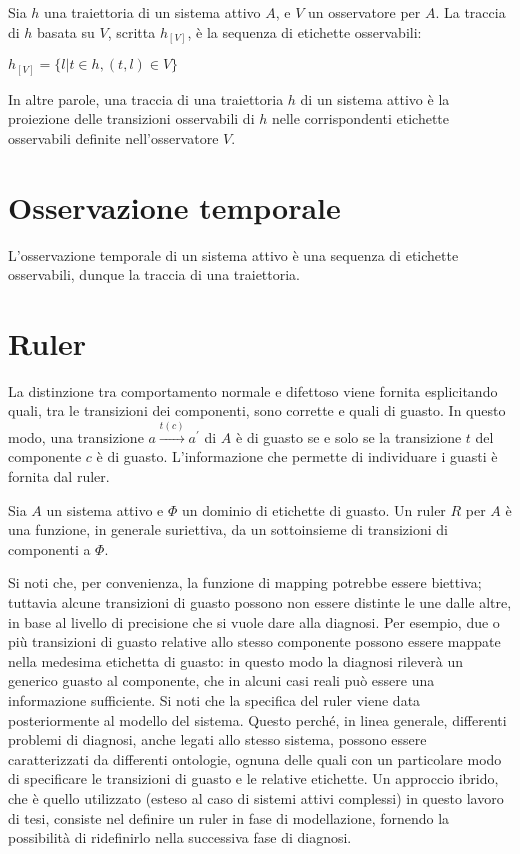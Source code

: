 \begin{defn}
Sia $h$ una traiettoria di un sistema attivo $A$, e $V$ un osservatore per $A$. La traccia di $h$ basata su $V$, scritta $h_{[V]}$, è la sequenza di etichette osservabili:
\begin{center}
$h_{[V]} = \{l|t \in h, (t,l) \in V\}$
\end{center}
\end{defn}
In altre parole, una traccia di una traiettoria $h$ di un sistema attivo è la proiezione delle transizioni osservabili di $h$ nelle corrispondenti etichette osservabili definite nell'osservatore $V$.

\section{Osservazione temporale}
L'osservazione temporale di un sistema attivo è una sequenza di etichette osservabili, dunque la traccia di una traiettoria. 

\section{Ruler}
La distinzione tra comportamento normale e difettoso viene fornita esplicitando quali, tra le transizioni dei componenti, sono corrette e quali di guasto. In questo modo, una transizione $a \xrightarrow{t(c)} a^\prime$ di $A$ è di guasto se e solo se la transizione $t$ del componente $c$ è di guasto.
L'informazione che permette di individuare i guasti è fornita dal ruler.
\begin{defn}
Sia $A$ un sistema attivo e $\Phi$ un dominio di etichette di guasto. Un ruler $R$ per $A$ è una funzione, in generale suriettiva, da un sottoinsieme di transizioni di componenti a $\Phi$.
\end{defn}
Si noti che, per convenienza, la funzione di mapping potrebbe essere biettiva; tuttavia alcune transizioni di guasto possono non essere distinte le une dalle altre, in base al livello di precisione che si vuole dare alla diagnosi. Per esempio, due o più transizioni di guasto relative allo stesso componente possono essere mappate nella medesima etichetta di guasto: in questo modo la diagnosi rileverà un generico guasto al componente, che in alcuni casi reali può essere una informazione sufficiente.
Si noti che la specifica del ruler viene data posteriormente al modello del sistema. Questo perché, in linea generale, differenti problemi di diagnosi, anche legati allo stesso sistema, possono essere caratterizzati da differenti ontologie, ognuna delle quali con un particolare modo di specificare le transizioni di guasto e le relative etichette. Un approccio ibrido, che è quello utilizzato (esteso al caso di sistemi attivi complessi) in questo lavoro di tesi, consiste nel definire un ruler in fase di modellazione, fornendo la possibilità di ridefinirlo nella successiva fase di diagnosi.


